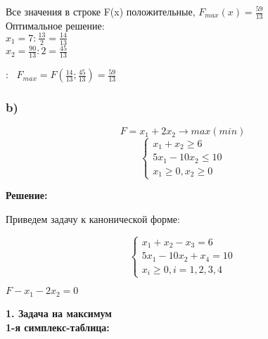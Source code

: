 \begin{flushleft}
    Все значения в строке F(x) положительные, $F_{max}(x) = \frac{59}{13}$\\
    Оптимальное решение:\\
    $x_1 = 7:\frac{13}{2} = \frac{14}{13}$\\
    $x_2 = \frac{90}{13}:2 = \frac{45}{13}$
\end{flushleft}

{:~} $F_{max} = F(\frac{14}{13}; \frac{45}{13}) = \frac{59}{13}$



\subsubsection{b)}
\begin{equation*}
    F = x_1 + 2x_2 \rightarrow max(min)
\end{equation*}
\begin{equation*}
    \begin{cases}
        x_1 + x_2 \ge 6 \\
        5x_1 - 10x_2 \le 10 \\
        x_1 \ge 0, x_2 \ge 0
    \end{cases}
\end{equation*}

\begin{center}
    {\bf
    Решение:}
\end{center}

\begin{flushleft}
Приведем задачу к канонической форме:
\end{flushleft}

\begin{equation*}
    \begin{cases}
        x_1 + x_2 - x_3 = 6 \\
        5x_1 - 10x_2 + x_4 = 10 \\
        x_i \ge 0, i = 1, 2, 3, 4
    \end{cases}
\end{equation*}
\begin{center}
    $F - x_1 - 2x_2 = 0$
\end{center}

\begin{flushleft}
    {\bf1. Задача на максимум}\\
    {\bf1-я симплекс-таблица:}\\
\end{flushleft}

